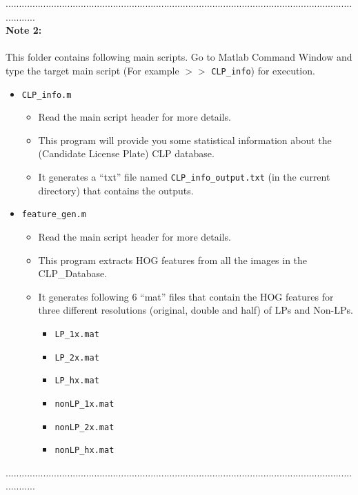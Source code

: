 \documentclass[a4paper,12pt]{article} %
\begin{document}
............................................................................................................................................\\
\textbf{Note 2: }\\\\
This folder contains following main scripts. Go to Matlab Command Window and type the target main script (For example $>>$  \verb|CLP_info|) for execution.
\begin{itemize}
	\item \verb|CLP_info.m|   
		\begin{itemize}
		\item Read the main script header for more details.
		\item This program will provide you some statistical information about the (Candidate License Plate) CLP database.
		\item It generates a ``txt'' file named \verb|CLP_info_output.txt| (in the current directory) that contains the outputs.	
		\end{itemize}
	\item \verb|feature_gen.m|
		\begin{itemize}
			\item Read the main script header for more details.
			\item This program extracts HOG features from all the images in the CLP\_Database.  
			\item It generates following 6 ``mat'' files that contain the HOG features for three different resolutions (original, double and half) of LPs and Non-LPs.
				\begin{itemize}
					\item \verb|LP_1x.mat|
					\item \verb|LP_2x.mat|
					\item \verb|LP_hx.mat|
					\item \verb|nonLP_1x.mat|
					\item \verb|nonLP_2x.mat|
					\item \verb|nonLP_hx.mat|						
				\end{itemize}
		\end{itemize}
\end{itemize}

............................................................................................................................................\\
\end{document}
